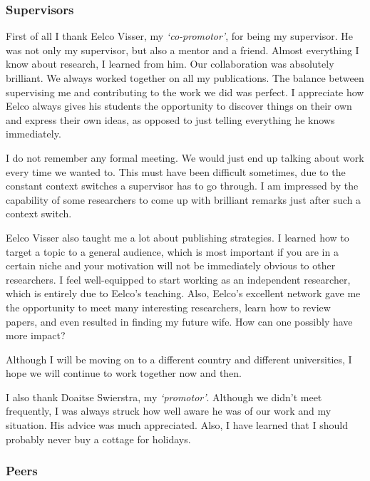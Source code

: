 \subsubsection*{Supervisors}

	First of all I thank Eelco Visser, my \emph{`co-promotor'},
        for being my supervisor. He was not only my supervisor, but
        also a mentor and a friend. Almost everything I know about
        research, I learned from him.
%
        Our collaboration was absolutely brilliant. We always worked
        together on all my publications. The balance between
        supervising me and contributing to the work we did was
        perfect. I appreciate how Eelco always gives his students the
        opportunity to discover things on their own and express their
        own ideas, as opposed to just telling everything he knows
        immediately.

        I do not remember any formal meeting. We would just end up
        talking about work every time we wanted to. This must have been
        difficult sometimes, due to the constant context switches a
        supervisor has to go through. I am impressed by the capability
        of some researchers to come up with brilliant remarks just
        after such a context switch.

        Eelco Visser also taught me a lot about publishing
        strategies. I learned how to target a topic to a general
        audience, which is most important if you are in a certain
        niche and your motivation will not be immediately obvious to
        other researchers. I feel well-equipped to start working as an
        independent researcher, which is entirely due to Eelco's
        teaching. Also, Eelco's excellent network gave me the
        opportunity to meet many interesting researchers, learn how to
        review papers, and even resulted in finding my future
        wife. How can one possibly have more impact?

        Although I will be moving on to a different country and
        different universities, I hope we will continue to work
        together now and then.

        I also thank Doaitse Swierstra, my \emph{`promotor'}. Although
        we didn't meet frequently, I was always struck how well aware
        he was of our work and my situation. His advice was much
        appreciated. Also, I have learned that I should probably never
        buy a cottage for holidays.

\subsubsection*{Peers}

